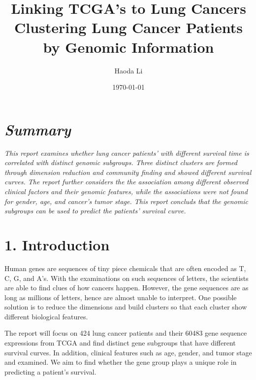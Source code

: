 \documentclass[11pt]{article}
\begin{document}
    
    \title{Linking TCGA's to Lung Cancers\\Clustering Lung Cancer Patients by Genomic Information}\author{Haoda Li}


\date{\today}
\maketitle


    
    

    

    \hypertarget{summary}{%
\section{\texorpdfstring{\emph{Summary}}{Summary}}\label{summary}}

\emph{This report examines whether lung cancer patients' with different
survival time is correlated with distinct genomic subgroups. Three
distinct clusters are formed through dimension reduction and community
finding and showed different survival curves. The report further
considers the the association among different observed clinical factors
and their genomic features, while the associations were not found for
gender, age, and cancer's tumor stage. This report concluds that the
genomic subgroups can be used to predict the patients' survival curve.}

    \hypertarget{introduction}{%
\section{1. Introduction}\label{introduction}}

Human genes are sequences of tiny piece chemicals that are often encoded
as T, C, G, and A's. With the examinations on such sequences of letters,
the scientists are able to find clues of how cancers happen. However,
the gene sequences are as long as millions of letters, hence are almost
unable to interpret. One possible solution is to reduce the dimensions
and build clusters so that each cluster show different biological
features.

The report will focus on 424 lung cancer patients and their 60483 gene
sequence expressions from TCGA \cite{weinstein2013cancer} and find
distinct gene subgroups that have different survival curves. In
addition, clinical features such as age, gender, and tumor stage and
examined. We aim to find whether the gene group plays a unique role in
predicting a patient's survival.
\end{document}
